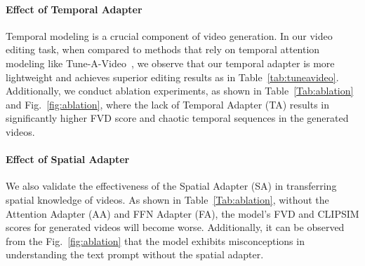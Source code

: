 \begin{table}[]
\centering
\caption{Ablation study on different modules. We report the FVD~\cite{fvd} and CLIPSIM~\cite{clip} on 1$K$ samples from the validation set of WebVid-10M~\cite{webvid}. TA, SA, AA, FA and LSA represent Temporal Adapter, Spatial Adapter, Attention Adapter, FFN Adapter and Latent-shift Attention, respectively.}
\label{Tab:ablation}
\end{table}

\paragraph{Effect of Temporal Adapter}
Temporal modeling is a crucial component of video generation. In our video editing task, when compared to methods that rely on temporal attention modeling like Tune-A-Video~\cite{tuneavideo}, we observe that our temporal adapter is more lightweight and achieves superior editing results as in Table~\ref{tab:tuneavideo}. Additionally, we conduct ablation experiments, as shown in Table~\ref{Tab:ablation} and Fig.~\ref{fig:ablation}, where the lack of Temporal Adapter (TA) results in significantly higher FVD score and chaotic temporal sequences in the generated videos.

\paragraph{Effect of Spatial Adapter}
We also validate the effectiveness of the Spatial Adapter (SA) in transferring spatial knowledge of videos. As shown in Table~\ref{Tab:ablation}, without the Attention Adapter (AA) and FFN Adapter (FA), the model's FVD and CLIPSIM scores for generated videos will become worse. Additionally, it can be observed from the Fig.~\ref{fig:ablation} that the model exhibits misconceptions in understanding the text prompt without the spatial adapter.

